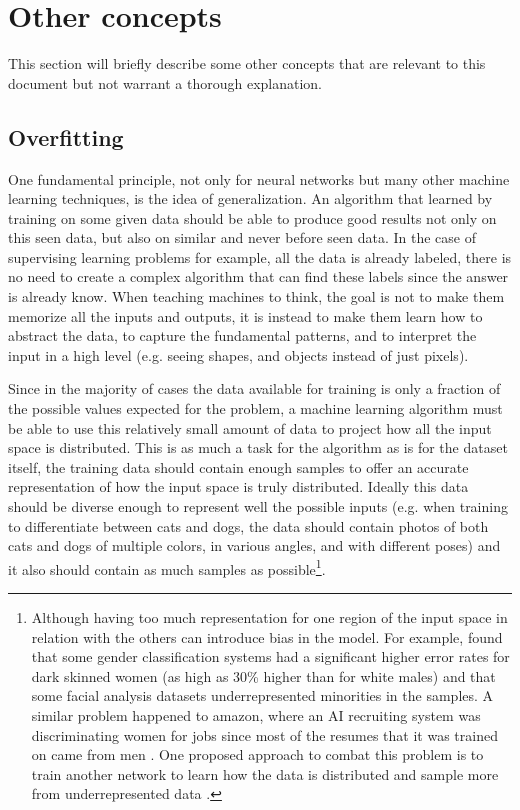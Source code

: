 \section{Other concepts} \label{sec:other_NN_concepts}
This section will briefly describe some other concepts that are relevant to this document but not warrant a thorough explanation.

\subsection{Overfitting} \label{sub:overfitting}
One fundamental principle, not only for neural networks but many other machine learning techniques, is the idea of generalization. An algorithm that learned by training on some given data should be able to produce good results not only on this seen data, but also on similar and never before seen data. In the case of supervising learning problems for example, all the data is already labeled, there is no need to create a complex algorithm that can find these labels since the answer is already know. When teaching machines to think, the goal is not to make them memorize all the inputs and outputs, it is instead to make them learn how to abstract the data, to capture the fundamental patterns, and to interpret the input in a high level (e.g. seeing shapes, and objects instead of just pixels).

Since in the majority of cases the data available for training is only a fraction of the possible values expected for the problem, a machine learning algorithm must be able to use this relatively small amount of data to project how all the input space is distributed. This is as much a task for the algorithm as is for the dataset itself, the training data should contain enough samples to offer an accurate representation of how the input space is truly distributed. Ideally this data should be diverse enough to represent well the possible inputs (e.g. when training to differentiate between cats and dogs, the data should contain photos of both cats and dogs of multiple colors, in various angles, and with different poses) and it also should contain as much samples as possible\footnote{
    Although having too much representation for one region of the input space in relation with the others can introduce bias in the model. For example, \cite{networkBias2018} found that some gender classification systems had a significant higher error rates for dark skinned women (as high as 30\% higher than for white males) and that some facial analysis datasets underrepresented minorities in the samples. A similar problem happened to amazon, where an AI recruiting system was discriminating women for jobs since most of the resumes that it was trained on came from men \cite{amazonBias2018}. One proposed approach to combat this problem is to train another network to learn how the data is distributed and sample more from underrepresented data \cite{debiasingVAE2019}.
}.

